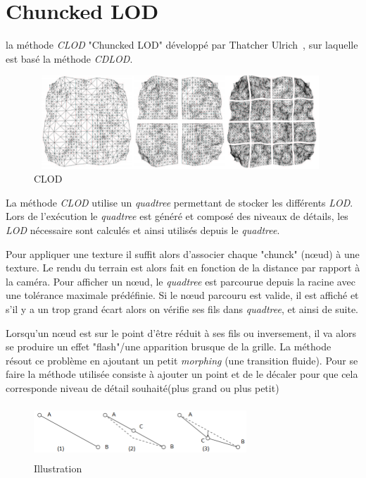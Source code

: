 \section*{Chuncked LOD}
  \label{sec:chunked-lod}

  
  la méthode \textit{CLOD} "Chuncked LOD" développé par Thatcher Ulrich~\cite{CLOD}, sur laquelle est basé la méthode \textit{CDLOD}.

\begin{figure}[!ht]
\centerline{
    \includegraphics[width=11cm,height=3.5cm]{img/clod.png}}
    \caption[CLOD]{CLOD\protect\footnotemark}
    \label{fig:clod}
\end{figure}


  La méthode \emph{CLOD} utilise un \textit{quadtree} permettant de stocker les différents \emph{LOD}. Lors de l'exécution le \emph{quadtree} est généré et composé des niveaux de détails, les \emph{LOD} nécessaire sont calculés et ainsi utilisés depuis le \emph{quadtree}. 
  
  Pour appliquer une texture il suffit alors d'associer chaque "chunck" (n\oe{}ud) à une texture.
  Le rendu du terrain est alors fait en fonction de la distance par rapport à la caméra. Pour afficher un n\oe{}ud, le \emph{quadtree} est parcourue depuis la racine avec une tolérance maximale prédéfinie. Si le n\oe{}ud parcouru est valide, il est affiché et s'il y a un trop grand écart alors on vérifie ses fils dans \emph{quadtree}, et ainsi de suite.
 
  Lorsqu'un n\oe{}ud est sur le point d'être réduit à ses fils ou inversement, il va alors se produire un effet "flash"/une apparition brusque de la grille. La méthode résout ce problème en ajoutant un petit \emph{morphing} (une transition fluide). Pour se faire la méthode utilisée consiste à ajouter un point et de le décaler pour que cela corresponde niveau de détail souhaité(plus grand ou plus petit)
 
 
 \begin{figure}[!ht]
 \centerline{
    \includegraphics[width=8cm,height=2cm]{img/morph-pop.png}}
    \caption[morph]{ Illustration \protect\footnotemark}
    \label{fig:morph-pop}
\end{figure}

